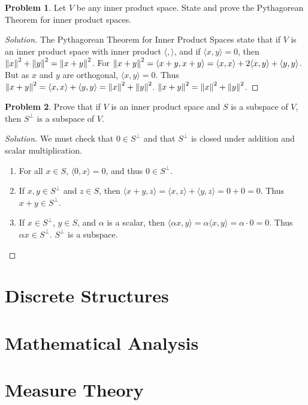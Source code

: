 \documentclass[oneside]{book}
\theoremstyle{definition}
\newtheorem{problem}{Problem}[section]
\begin{document}
\begin{problem}
Let $V$ be any inner product space. State and prove the Pythagorean Theorem for inner product spaces.
\end{problem}
\begin{proof}[Solution]
The Pythagorean Theorem for Inner Product Spaces state that if $V$ is an inner product space with inner product $\langle, \rangle$, and if $\langle x,y\rangle = 0$, then $\norm{x}^2+\norm{y}^2 = \norm{x+y}^2$. For $\norm{x+y}^2 = \langle x+y,x+y\rangle = \langle x,x\rangle + 2\langle x,y\rangle +\langle y,y\rangle$. But as $x$ and $y$ are orthogonal, $\langle x,y \rangle = 0$. Thus $\norm{x+y}^2 = \langle x,x\rangle + \langle y,y\rangle = \norm{x}^2+\norm{y}^2$. $\norm{x+y}^2 =\norm{x}^2+\norm{y}^2$.
\end{proof}

\begin{problem}
Prove that if $V$ is an inner product space and $S$ is a subspace of $V$, then $S^{\perp}$ is a subspace of $V$.
\end{problem}
\begin{proof}[Solution]
We must check that $0\in S^{\perp}$ and that $S^{\perp}$ is closed under addition and scalar multiplication.
\begin{enumerate}
\item For all $x\in S$, $\langle 0,x \rangle = 0$, and thus $0\in S^{\perp}$.
\item If $x,y\in S^{\perp}$ and $z\in S$, then $\langle x+y,z\rangle = \langle x,z\rangle + \langle y,z\rangle = 0+0=0$. Thus $x+y\in S^{\perp}$.
\item If $x\in S^{\perp}$, $y\in S$, and $\alpha$ is a scalar, then $\langle \alpha x,y \rangle = \alpha \langle x,y \rangle = \alpha \cdot 0 = 0$. Thus $\alpha x \in S^{\perp}$. $S^{\perp}$ is a subspace.
\end{enumerate}
\end{proof}

\chapter{Discrete Structures}

\chapter{Mathematical Analysis}

\chapter{Measure Theory}
\end{document}
